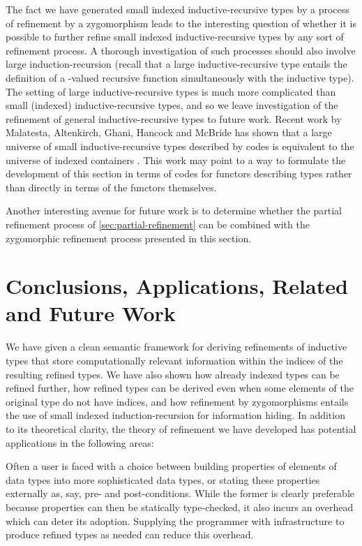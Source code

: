 \documentclass{LMCS}
\begin{document}
The fact we have generated small indexed inductive-recursive types by
a process of refinement by a zygomorphism leads to the interesting
question of whether it is possible to further refine small indexed
inductive-recursive types by any sort of refinement process. A
thorough investigation of such processes should also involve large
induction-recursion (recall that a large inductive-recursive type
entails the definition of a -valued recursive function
simultaneously with the inductive type). The setting of large
inductive-recursive types is much more complicated than small
(indexed) inductive-recursive types, and so we leave investigation of
the refinement of general inductive-recursive types to future
work. Recent work by Malatesta, Altenkirch, Ghani, Hancock and McBride
\cite{malatesta12small} has shown that a large universe of small
inductive-recursive types described by codes is equivalent to the
universe of indexed containers \cite{alten09indexed}. This work may
point to a way to formulate the development of this section in terms
of codes for functors describing types rather than directly in terms
of the functors themselves.

Another interesting avenue for future work is to determine whether the
partial refinement process of \autoref{sec:partial-refinement} can be
combined with the zygomorphic refinement process presented in this
section.

\section{Conclusions, Applications, Related and Future Work}
\label{sec:discussion}

We have given a clean semantic framework for deriving refinements of
inductive types that store computationally relevant information within
the indices of the resulting refined types. We have also shown how
already indexed types can be refined further, how refined types can be
derived even when some elements of the original type do not have
indices, and how refinement by zygomorphisms entails the use of small
indexed induction-recursion for information hiding. In addition to its
theoretical clarity, the theory of refinement we have developed has
potential applications in the following areas:

\medskip

 Often a user is faced
with a choice between building properties of elements of data types
into more sophisticated data types, or stating these properties
externally as, say, pre- and post-conditions. While the former is
clearly preferable because properties can then be statically
type-checked, it also incurs an overhead which can deter its
adoption. Supplying the programmer with infrastructure to produce
refined types as needed can reduce this overhead.
\end{document}
